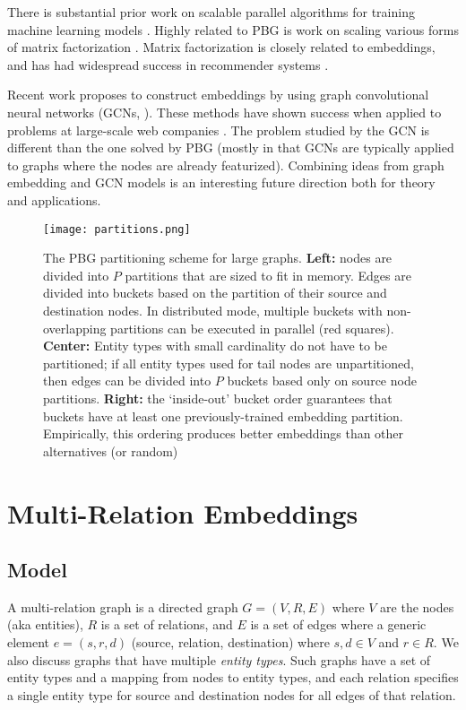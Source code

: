 \documentclass{article}
\begin{document}
There is substantial prior work on scalable parallel algorithms for training machine learning models \cite{Dean2012}. Highly related to PBG is work on scaling various forms of matrix factorization \cite{gupta1997highly,Gemulla:2011:LMF:2020408.2020426}. Matrix factorization is closely related to embeddings, and has had widespread success in recommender systems \cite{koren2009matrix}.

Recent work proposes to construct embeddings by using graph convolutional neural networks (GCNs, \citealt{kipf2016semi}). These methods have shown success when applied to problems at large-scale web companies \cite{hamilton2017inductive,ying2018graph}. The problem studied by the GCN is different than the one solved by PBG (mostly in that GCNs are typically applied to graphs where the nodes are already featurized). Combining ideas from graph embedding and GCN models is an interesting future direction both for theory and applications.

\begin{figure*}[t]
\centering
\texttt{[image: partitions.png]}
\caption{The PBG partitioning scheme for large graphs. \textbf{Left:} nodes are divided into $P$ partitions that are sized to fit in memory. Edges are divided into buckets based on the partition of their source and destination nodes. In distributed mode, multiple buckets with non-overlapping partitions can be executed in parallel (red squares). \textbf{Center:} Entity types with small cardinality do not have to be partitioned; if all entity types used for tail nodes are unpartitioned, then edges can be divided into $P$ buckets based only on source node partitions. \textbf{Right:} the `inside-out' bucket order guarantees that buckets have at least one previously-trained embedding partition. Empirically, this ordering produces better embeddings than other alternatives (or random)}
\label{fig:partitions}
\end{figure*}

\section{Multi-Relation Embeddings}
\subsection{Model}
\label{section:model_description}

A multi-relation graph is a directed graph $G=(V,R,E)$ where $V$ are the nodes (aka entities), $R$ is a set of relations, and $E$ is a set of edges where a generic element $e = (s, r, d)$ (source, relation, destination) where $s, d\in V$ and $r \in R.$ We also discuss graphs that have multiple \textit{entity types}. Such graphs have a set of entity types and a mapping from nodes to entity types, and each relation specifies a single entity type for source and destination nodes for all edges of that relation.
\end{document}
